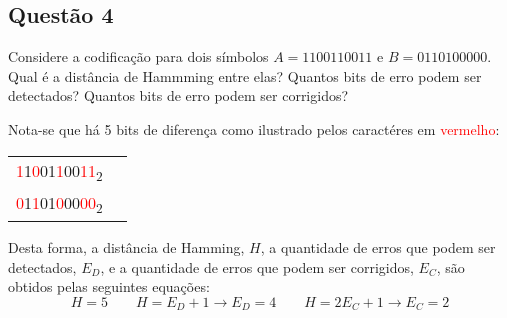 \documentclass{article}
\begin{document}
        \newpage\subsection{Questão 4}
            \begin{exercise}
                Considere a codificação para dois símbolos $A = 1100110011$ e $B = 0110100000$. Qual é a distância de Hammming entre elas? Quantos bits de erro podem ser detectados? Quantos bits de erro podem ser corrigidos?
            \end{exercise}
            \begin{resolution}
                Nota-se que há 5 bits de diferença como ilustrado pelos caractéres em \textcolor{red}{vermelho}:
                    \begin{table}[H]
                        \centering
                        \begin{tabular}[]{cc}\hline
                            \textcolor{red}{1}1\textcolor{red}{0}01\textcolor{red}{1}00\textcolor{red}{11}\textsubscript{2}\\
                            \textcolor{red}{0}1\textcolor{red}{1}01\textcolor{red}{0}00\textcolor{red}{00}\textsubscript{2}\\\hline
                        \end{tabular}
                    \end{table}\noindent
                Desta forma, a distância de Hamming, $H$, a quantidade de erros que podem ser detectados, $E_{D}$, e a quantidade de erros que podem ser corrigidos, $E_{C}$, são obtidos pelas seguintes equações:
                    \begin{equation*}
                        \boxed{H = 5}
                        \qquad
                        H =  E_{D} + 1 \rightarrow \boxed{E_{D} = 4}
                        \qquad
                        H = 2E_{C} + 1 \rightarrow \boxed{E_{C} = 2}
                    \end{equation*}
            \end{resolution}
\end{document}
